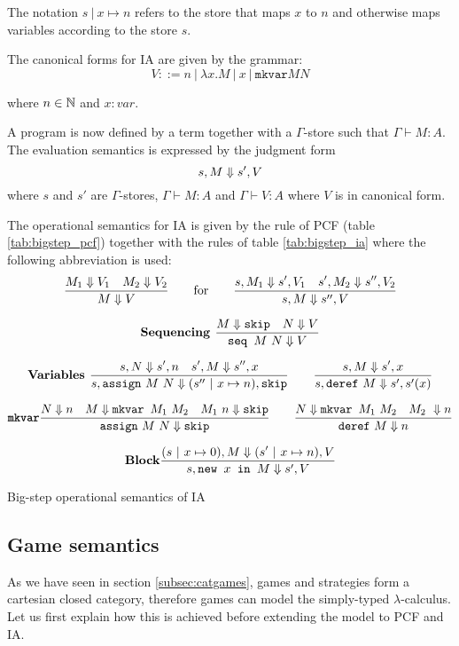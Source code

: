 The notation $s\ |\ x \mapsto n$ refers to the store that maps $x$ to $n$
and otherwise maps variables according to the store $s$.


The canonical forms for IA are given by the grammar:
$$ V ::= n\ |\ \lambda x. M\ |\ x\ |\  \texttt{mkvar} M N$$

where $n \in \mathbb{N}$ and $x:var$.


A program is now defined by a term together with a $\Gamma$-store such that $\Gamma \vdash M : A$.
The evaluation semantics is expressed by the judgment form
$$s,M \Downarrow s', V$$
where $s$ and $s'$ are $\Gamma$-stores,
$\Gamma \vdash M : A$ and $\Gamma \vdash V : A$ where $V$ is in canonical form.

The operational semantics for IA is given by the rule of PCF (table \ref{tab:bigstep_pcf})
together with the rules of table \ref{tab:bigstep_ia} where the following abbreviation is used:
$$ \frac{\displaystyle M_1 \Downarrow V_1 \quad M_2 \Downarrow V_2}{M \Downarrow V} \qquad \mbox{for} \qquad
  \frac{\displaystyle s,M_1 \Downarrow s',V_1 \quad s', M_2 \Downarrow s'',V_2 }{s,M \Downarrow s'',V}
$$


\begin{table}[htbp]
$$\mbox{\textbf{Sequencing }}
    \frac{\displaystyle M \Downarrow \texttt{skip} \quad N \Downarrow V}{\texttt{seq } M\ N \Downarrow V}
$$

$$\mbox{\textbf{Variables }}
    \frac{\displaystyle s,N \Downarrow s',n \quad s',M \Downarrow s'',x}{s, \texttt{assign}\ M\ N \Downarrow (s''\ |\ x \mapsto n),\texttt{skip}}
\qquad
    \frac{\displaystyle s,M \Downarrow s',x }{s, \texttt{deref}\ M \Downarrow s',s'(x)}$$

$$\mbox{\texttt{\textbf{mkvar}}}
    \frac{\displaystyle N \Downarrow n \quad M \Downarrow \texttt{mkvar } M_1\ M_2 \quad M_1\ n \Downarrow \texttt{skip}}{\texttt{assign}\ M\ N \Downarrow \texttt{skip}}
\qquad
    \frac{\displaystyle N \Downarrow \texttt{mkvar } M_1\ M_2 \quad M_2\ \Downarrow n}{\texttt{deref}\ M \Downarrow n}
$$

$$\mbox{\textbf{Block}}
    \frac{\displaystyle (s\ |\ x \mapsto 0),M \Downarrow (s'\ |\ x \mapsto n),V }{s, \texttt{new } x \texttt{ in } M \Downarrow s',V}
$$

\label{tab:bigstep_ia}
\caption{Big-step operational semantics of IA}
\end{table}

\subsection{Game semantics}

As we have seen in section \ref{subsec:catgames}, games and strategies
form a cartesian closed category, therefore games can model the simply-typed $\lambda$-calculus. Let us first
explain how this is achieved before extending the model to PCF and IA.

